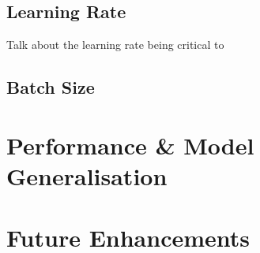 \documentclass[a4paper]{article}
\begin{document}
\subsection{Learning Rate}
Talk about the learning rate being critical to 

\subsection{Batch Size}

\section{Performance \& Model Generalisation}

\section{Future Enhancements}
\end{document}

